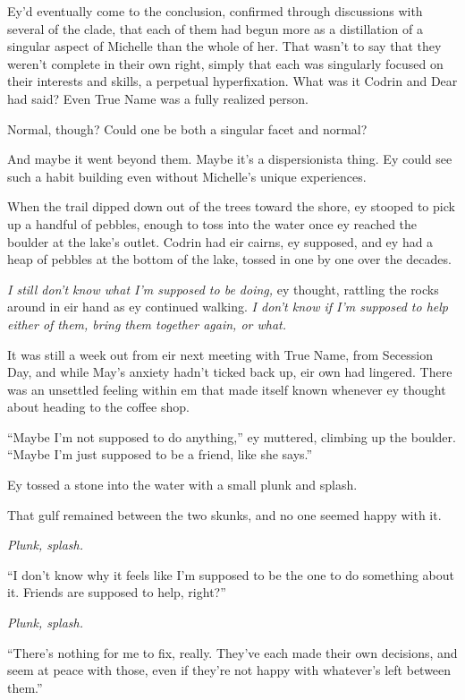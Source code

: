 Ey'd eventually come to the conclusion, confirmed through discussions with several of the clade, that each of them had begun more as a distillation of a singular aspect of Michelle than the whole of her. That wasn't to say that they weren't complete in their own right, simply that each was singularly focused on their interests and skills, a perpetual hyperfixation. What was it Codrin and Dear had said? Even True Name was a fully realized person.

Normal, though? Could one be both a singular facet and normal?

And maybe it went beyond them. Maybe it's a dispersionista thing. Ey could see such a habit building even without Michelle's unique experiences.

When the trail dipped down out of the trees toward the shore, ey stooped to pick up a handful of pebbles, enough to toss into the water once ey reached the boulder at the lake's outlet. Codrin had eir cairns, ey supposed, and ey had a heap of pebbles at the bottom of the lake, tossed in one by one over the decades.

\emph{I still don't know what I'm supposed to be doing,} ey thought, rattling the rocks around in eir hand as ey continued walking. \emph{I don't know if I'm supposed to help either of them, bring them together again, or what.}

It was still a week out from eir next meeting with True Name, from Secession Day, and while May's anxiety hadn't ticked back up, eir own had lingered. There was an unsettled feeling within em that made itself known whenever ey thought about heading to the coffee shop.

``Maybe I'm not supposed to do anything,'' ey muttered, climbing up the boulder. ``Maybe I'm just supposed to be a friend, like she says.''

Ey tossed a stone into the water with a small plunk and splash.

That gulf remained between the two skunks, and no one seemed happy with it.

\emph{Plunk, splash.}

``I don't know why it feels like I'm supposed to be the one to do something about it. Friends are supposed to help, right?''

\emph{Plunk, splash.}

``There's nothing for me to fix, really. They've each made their own decisions, and seem at peace with those, even if they're not happy with whatever's left between them.''

